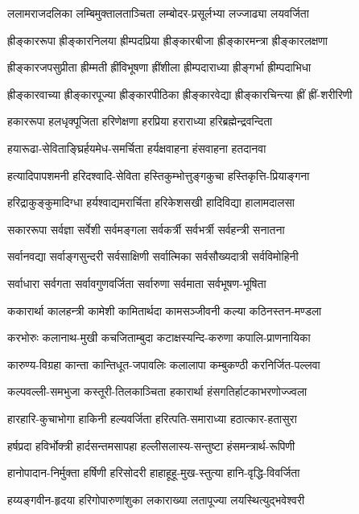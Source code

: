 \twolineshloka
{ललामराजदलिका लम्बिमुक्तालताञ्चिता}
{लम्बोदर-प्रसूर्लभ्या लज्जाढ्या लयवर्जिता}

\twolineshloka
{ह्रीङ्काररूपा ह्रीङ्कारनिलया ह्रीम्पदप्रिया}
{ह्रीङ्कारबीजा ह्रीङ्कारमन्त्रा ह्रीङ्कारलक्षणा}

\twolineshloka
{ह्रीङ्कारजपसुप्रीता ह्रीम्मती ह्रींविभूषणा}
{ह्रींशीला ह्रीम्पदाराध्या ह्रीङ्गर्भा ह्रीम्पदाभिधा}

\twolineshloka
{ह्रीङ्कारवाच्या ह्रीङ्कारपूज्या ह्रीङ्कारपीठिका}
{ह्रीङ्कारवेद्या ह्रीङ्कारचिन्त्या ह्रीं ह्रीं-शरीरिणी}

\twolineshloka
{हकाररूपा हलधृक्पूजिता हरिणेक्षणा}
{हरप्रिया हराराध्या हरिब्रह्मेन्द्रवन्दिता}

\twolineshloka
{हयारूढा-सेविताङ्घ्रिर्हयमेध-समर्चिता}
{हर्यक्षवाहना हंसवाहना हतदानवा}

\twolineshloka
{हत्यादिपापशमनी हरिदश्वादि-सेविता}
{हस्तिकुम्भोत्तुङ्गकुचा हस्तिकृत्ति-प्रियाङ्गना}

\twolineshloka
{हरिद्राकुङ्कुमादिग्धा हर्यश्वाद्यमरार्चिता}
{हरिकेशसखी हादिविद्या हालामदालसा}

\twolineshloka
{सकाररूपा सर्वज्ञा सर्वेशी सर्वमङ्गला}
{सर्वकर्त्री सर्वभर्त्री सर्वहन्त्री सनातना}

\twolineshloka
{सर्वानवद्या सर्वाङ्गसुन्दरी सर्वसाक्षिणी}
{सर्वात्मिका सर्वसौख्यदात्री सर्वविमोहिनी}

\twolineshloka
{सर्वाधारा सर्वगता सर्वावगुणवर्जिता}
{सर्वारुणा सर्वमाता सर्वभूषण-भूषिता}

\twolineshloka
{ककारार्था कालहन्त्री कामेशी कामितार्थदा}
{कामसञ्जीवनी कल्या कठिनस्तन-मण्डला}

\twolineshloka
{करभोरुः कलानाथ-मुखी कचजिताम्बुदा}
{कटाक्षस्यन्दि-करुणा कपालि-प्राणनायिका}

\twolineshloka
{कारुण्य-विग्रहा कान्ता कान्तिधूत-जपावलिः}
{कलालापा कम्बुकण्ठी करनिर्जित-पल्लवा}

\twolineshloka
{कल्पवल्ली-समभुजा कस्तूरी-तिलकाञ्चिता}
{हकारार्था हंसगतिर्हाटकाभरणोज्ज्वला}

\twolineshloka
{हारहारि-कुचाभोगा हाकिनी हल्यवर्जिता}
{हरित्पति-समाराध्या हठात्कार-हतासुरा}

\twolineshloka
{हर्षप्रदा हविर्भोक्त्री हार्दसन्तमसापहा}
{हल्लीसलास्य-सन्तुष्टा हंसमन्त्रार्थ-रूपिणी}

\twolineshloka
{हानोपादान-निर्मुक्ता हर्षिणी हरिसोदरी}
{हाहाहूहू-मुख-स्तुत्या हानि-वृद्धि-विवर्जिता}

\twolineshloka
{हय्यङ्गवीन-हृदया हरिगोपारुणांशुका}
{लकाराख्या लतापूज्या लयस्थित्युद्भवेश्वरी}

